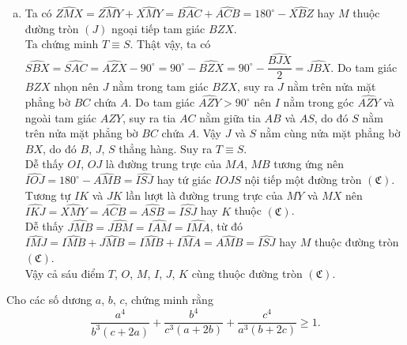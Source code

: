 \begin{ex}
{\begin{enumerate}[a)]
\item Ta có $\widehat{ZMX}=\widehat{ZMY}+\widehat{XMY}=\widehat{BAC}+\widehat{ACB}=180^\circ -\widehat{XBZ}$ hay $M$ thuộc đường tròn $(J)$ ngoại tiếp tam giác $BZX$.\\
Ta chứng minh $T\equiv S$. Thật vậy, ta có $\widehat{SBX}=\widehat{SAC}=\widehat{AZX}-90^\circ=90^\circ - \widehat{BZX}=90^\circ-\dfrac{\widehat{BJX}}{2}=\widehat{JBX}$. Do tam giác $BZX$ nhọn nên $J$ nằm trong tam giác $BZX$, suy ra $J$ nằm trên nửa mặt phẳng bờ $BC$ chứa $A$. Do tam giác $\widehat{AZY}>90^\circ$ nên $I$ nằm trong góc $\widehat{AZY}$ và ngoài tam giác $AZY$, suy ra tia $AC$ nằm giữa tia $AB$ và $AS$, do đó $S$ nằm trên nửa mặt phẳng bờ $BC$ chứa $A$. Vậy $J$ và $S$ nằm cùng nửa mặt phẳng bờ $BX$, do đó $B$, $J$, $S$ thẳng hàng. Suy ra $T\equiv S$.\\
Dễ thấy $OI$, $OJ$ là đường trung trực của $MA$, $MB$ tương ứng nên $\widehat{IOJ}=180^\circ-\widehat{AMB}=\widehat{ISJ}$ hay tứ giác $IOJS$ nội tiếp một đường tròn $(\mathfrak{C})$.\\
Tương tự $IK$ và $JK$ lần lượt là đường trung trực của $MY$ và $MX$ nên $\widehat{IKJ}=\widehat{XMY}=\widehat{ACB}=\widehat{ASB}=\widehat{ISJ}$ hay $K$ thuộc $(\mathfrak{C})$.\\
Dễ thấy $\widehat{JMB}=\widehat{JBM}=\widehat{IAM}=\widehat{IMA}$, từ đó $\widehat{IMJ}=\widehat{IMB}+\widehat{JMB}=\widehat{IMB}+\widehat{IMA}=\widehat{AMB}=\widehat{ISJ}$ hay $M$ thuộc đường tròn $(\mathfrak{C})$.\\
Vậy cả sáu điểm $T$, $O$, $M$, $I$, $J$, $K$ cùng thuộc đường tròn $(\mathfrak{C})$.
\end{enumerate}
}
\end{ex}

\begin{ex}%
Cho các số dương $a$, $b$, $c$, chứng minh rằng
$$\dfrac{a^4}{b^3(c+2a)}+\dfrac{b^4}{c^3(a+2b)}+\dfrac{c^4}{a^3(b+2c)}\ge 1.$$
\end{ex}


